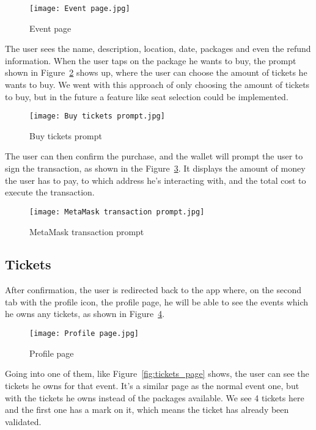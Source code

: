 \begin{figure}[H]
	\texttt{[image: Event page.jpg]}
	\centering
	\caption{Event page}\label{fig:event_page}
\end{figure}

The user sees the name, description, location, date, packages and even the
refund information. When the user taps on the package he wants to buy, the
prompt shown in Figure~\ref{fig:buy_tickets_prompt} shows up, where the user
can choose the amount of tickets he wants to buy. We went with this approach of
only choosing the amount of tickets to buy, but in the future a feature like
seat selection could be implemented.

\begin{figure}[H]
	\texttt{[image: Buy tickets prompt.jpg]}
	\centering
	\caption{Buy tickets prompt}\label{fig:buy_tickets_prompt}
\end{figure}

The user can then confirm the purchase, and the wallet will prompt the user to
sign the transaction, as shown in the
Figure~\ref{fig:metamask_transaction_prompt}. It displays the amount of money
the user has to pay, to which address he's interacting with, and the total cost
to execute the transaction.

\begin{figure}[H]
	\texttt{[image: MetaMask transaction prompt.jpg]}
	\centering
	\caption{MetaMask transaction prompt}\label{fig:metamask_transaction_prompt}
\end{figure}

\subsection{Tickets}\label{subsec:tickets}

After confirmation, the user is redirected back to the app where, on the second
tab with the profile icon, the profile page, he will be able to see the events
which he owns any tickets, as shown in Figure~\ref{fig:profile_page}.

\begin{figure}[H]
	\texttt{[image: Profile page.jpg]}
	\centering
	\caption{Profile page}\label{fig:profile_page}
\end{figure}

Going into one of them, like Figure~\ref{fig:tickets_page} shows, the user can
see the tickets he owns for that event. It's a similar page as the normal event
one, but with the tickets he owns instead of the packages available. We see 4
tickets here and the first one has a mark on it, which means the ticket has
already been validated.

